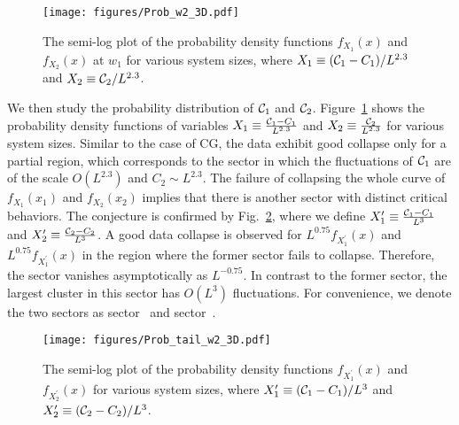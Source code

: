 \begin{figure}[b]
	\vspace{3ex}
	\centering
	\texttt{[image: figures/Prob\_w2\_3D.pdf]}
	\caption{The semi-log plot of the probability density functions $f_{X_1}(x)$ and $f_{X_2}(x)$ at $w_1$ for various system sizes, 
	where $X_1 \equiv ({\mathcal C}_1 - C_1)/L^{2.3}$ and $X_2 \equiv {\mathcal C}_2/L^{2.3}$.}
	\label{fig:prob_w2_3D}
	\vspace{3ex}
\end{figure}

We then study the probability distribution of ${\mathcal C}_1$ and ${\mathcal C}_2$. Figure~\ref{fig:prob_w2_3D} shows the probability density 
functions of variables $X_1 \equiv \frac{{\mathcal C}_1 - C_1}{L^{2.3}}$ and $X_2 \equiv \frac{{\mathcal C}_2}{L^{2.3}}$ for various system sizes. 
Similar to the case of CG, the data exhibit good collapse only for a partial region, which corresponds to the sector in which
the fluctuations of ${\mathcal C}_1$ are of the scale $O(L^{2.3})$ and $C_2 \sim L^{2.3}$. The failure of collapsing the whole curve
of $f_{X_1}(x_1)$ and $f_{X_2}(x_2)$ implies that there is another sector with distinct critical behaviors.
The conjecture is confirmed by Fig.~\ref{fig:prob_w2_3D_tail}, where we define $X_1^\prime \equiv \frac{{\mathcal C}_1 - C_1}{L^3}$ and $X_2^\prime \equiv \frac{{\mathcal C}_2 - C_2}{L^3}$.
A good data collapse is observed for $L^{0.75}f_{X_1^\prime}(x)$ and $L^{0.75}f_{X_1^\prime}(x)$ in the region where the former sector fails to collapse.
Therefore, the sector vanishes asymptotically as $L^{-0.75}$. In contrast to the former sector, the largest cluster in this sector has $O(L^3)$ fluctuations.
For convenience, we denote the two sectors as sector~ and sector~.


\begin{figure}[t]
	\vspace{3ex}
	\centering
	\texttt{[image: figures/Prob\_tail\_w2\_3D.pdf]}
	\caption{The semi-log plot of the probability density functions $f_{X_1^\prime}(x)$ and $f_{X_2^\prime}(x)$ for various system sizes, 
	where $X_1^\prime \equiv ({\mathcal C}_1 - C_1)/L^{3}$ and $X_2^\prime \equiv ({\mathcal C}_2 - C_2)/L^{3}$.}
	\label{fig:prob_w2_3D_tail}
	\vspace{3ex}
\end{figure}

